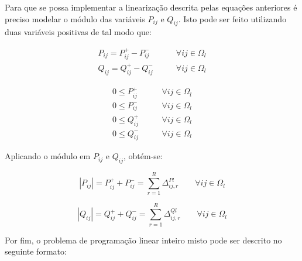 Para que se possa implementar a linearização descrita pelas equações anteriores é preciso modelar o módulo das variáveis $P_{ij}$ e $Q_{ij}$. Isto pode ser feito utilizando duas variáveis positivas de tal modo que:

\begin{equation}\label{eq:Lin_PQmod}
    \begin{split}
        P_{ij} = P_{ij}^{+} - P_{ij}^{-} & \qquad\forall ij\in\Omega_{l}\\
        Q_{ij} = Q_{ij}^{+} - Q_{ij}^{-} & \qquad\forall ij\in\Omega_{l}
    \end{split}
\end{equation}

\begin{equation}
    \begin{split}
        0 \leq P_{ij}^{+} & \qquad\forall ij\in\Omega_{l}\\
        0 \leq P_{ij}^{-} & \qquad\forall ij\in\Omega_{l}\\
        0 \leq Q_{ij}^{+} & \qquad\forall ij\in\Omega_{l}\\
        0 \leq Q_{ij}^{-} & \qquad\forall ij\in\Omega_{l}
    \end{split}
\end{equation}

Aplicando o módulo em $P_{ij}$ e $Q_{ij}$, obtém-se:

\begin{equation}\label{eq:Lin_modPA}
        |P_{ij}| = P_{ij}^{+} + P_{ij}^{-} = \sum_{r = 1}^{R}\Delta_{ij,r}^{Pl}  \qquad\forall ij\in\Omega_{l}
\end{equation}

\begin{equation}\label{eq:Lin_modPR}
        |Q_{ij}| = Q_{ij}^{+} + Q_{ij}^{-} = \sum_{r = 1}^{R}\Delta_{ij,r}^{Ql}  \qquad\forall ij\in\Omega_{l}
\end{equation}

Por fim, o problema de programação linear inteiro misto pode ser descrito no seguinte formato:


